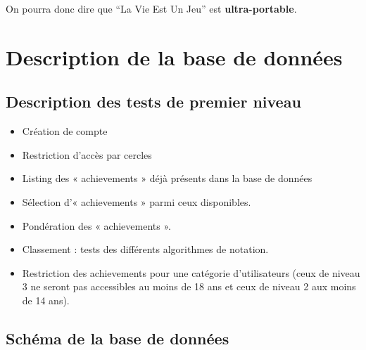 \documentclass{life-fr}
\begin{document}
On pourra donc dire que ``La Vie Est Un Jeu'' est \textbf{ultra-portable}.


\chapter{Description de la base de données}

\section{Description des tests de premier niveau}

\begin{itemize}
  \item Création de compte
  \item Restriction d’accès par cercles
  \item Listing des « achievements » déjà présents dans la base de données
  \item Sélection d’« achievements » parmi ceux disponibles.
  \item Pondération des « achievements ».
  \item Classement : tests des différents algorithmes de notation.
  \item Restriction des achievements pour une catégorie d’utilisateurs (ceux de niveau 3 ne seront pas accessibles au moins de 18 ans et ceux de niveau 2 aux moins de 14 ans).
\end{itemize}

\section{Schéma de la base de données}
\end{document}
